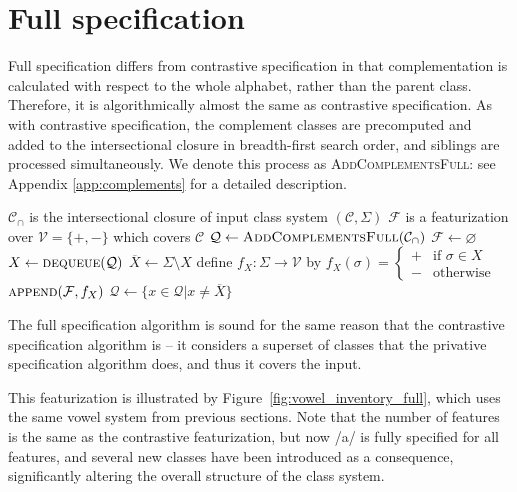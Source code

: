 \documentclass[11pt, oneside]{article}   	%
\begin{document}
\FloatBarrier
\section{Full specification}
\label{sec:full}

Full specification differs from contrastive specification in that complementation is calculated with respect to the whole alphabet, rather than the parent class. Therefore, it is algorithmically almost the same as contrastive specification. As with contrastive specification, the complement classes are precomputed and added to the intersectional closure in breadth-first search order, and siblings are processed simultaneously. We denote this process as \textsc{AddComplementsFull}: see Appendix \ref{app:complements} for a detailed description.

\vspace{\baselineskip} \noindent \begin{algorithmic}
    \REQUIRE $\mathcal C_\cap$ is the intersectional closure of input class system $(\mathcal C, \Sigma)$
    \ENSURE $\mathcal F$ is a featurization over $\mathcal V = \{ +, - \}$ which covers $\mathcal C$
    \STATE
    \STATE $\mathcal Q \leftarrow \textsc{AddComplementsFull}(\mathcal{C_\cap})$
    \STATE $\mathcal F \leftarrow \varnothing$
    \STATE
        \STATE $X \leftarrow \textsc{dequeue}(\mathcal Q)$
	        \STATE $\overline{X} \leftarrow \Sigma \setminus X$
            \STATE define $f_X : \Sigma \rightarrow \mathcal V$ by $f_X (\sigma) = \begin{cases}
                    + & \text{if } \sigma \in X \\
                    - & \text{otherwise}
                    \end{cases}$
            \STATE $\textsc{append}(\mathcal F, f_X)$
            \STATE $\mathcal{Q} \leftarrow \{x \in \mathcal{Q} \vert x \neq \overline{X} \}$
        \ENDIF
    \ENDWHILE
\end{algorithmic}

\vspace{\baselineskip} \noindent The full specification algorithm is sound for the same reason that the contrastive specification algorithm is -- it considers a superset of classes that the privative specification algorithm does, and thus it covers the input.

This featurization is illustrated by Figure~\ref{fig:vowel_inventory_full}, which uses the same vowel system from previous sections. Note that the number of features is the same as the contrastive featurization, but now /a/ is fully specified for all features, and several new classes have been introduced as a consequence, significantly altering the overall structure of the class system.
\end{document}
